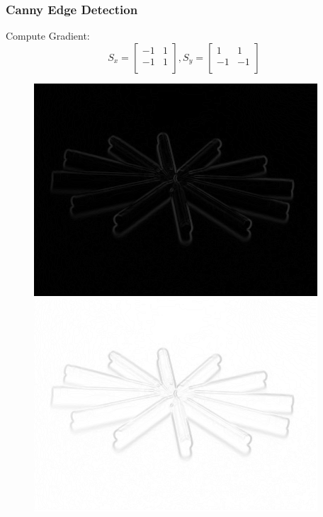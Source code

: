 \documentclass[notheorems,serif,table,compress]{beamer}  %
\begin{document}
\begin{frame}
\frametitle{Canny Edge Detection}
{\color{blue}Compute Gradient:}
    \begin{displaymath}
    S_{x}=\left[ \begin{array}{cc}
    -1 & 1 \\
    -1 & 1 \\
    \end{array} \right],
    S_{y}=\left[ \begin{array}{cc}
    1 & 1 \\
    -1 & -1 \\
    \end{array} \right]
    \end{displaymath}
    \begin{figure}
        \begin{minipage}[t]{0.45\linewidth}
            \includegraphics[width=1\linewidth]{gradResult.png} 
        \end{minipage}
        \begin{minipage}[t]{0.45\linewidth}
            \includegraphics[width=1\linewidth]{not.png} 
        \end{minipage}
    \end{figure}
\end{frame}
\end{document}
